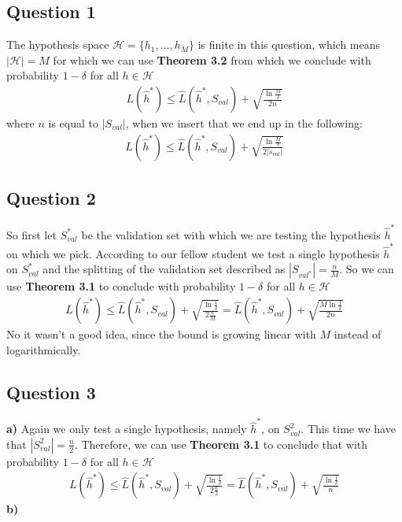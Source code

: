 \subsection{Question 1}
The hypothesis space $\mathcal{H} = \{h_1,...,h_M \}$ is finite in this question, which means $|\mathcal{H}| = M$ for which we can use \textbf{Theorem 3.2} from which we conclude with probability $1 - \delta$ for all $h \in \mathcal{H}$
\begin{align}
L(\hat{h}^*) \leq \hat{L}(\hat{h}^*, S_{val}) + \sqrt{\frac{\ln \frac{M}{\delta}}{2n}}
\end{align}
where $n$ is equal to $|S_{val}|$, when we insert that we end up in the following:
\begin{align}
L(\hat{h}^*) \leq \hat{L}(\hat{h}^*, S_{val}) + \sqrt{\frac{\ln \frac{M}{\delta}}{2|s_{val}|}}
\end{align}

\subsection{Question 2}
So first let $S_{val}^*$ be the validation set with which we are testing the hypothesis $\hat{h}^*$ on which we pick.
According to our fellow student we test a single hypothesis $\hat{h}^*$ on $S_{val}^*$ and the splitting of the validation set described as $|S_{val^*}|=\frac{n}{M}$.
So we can use \textbf{Theorem 3.1} to conclude with probability $1 - \delta$ for all $h \in \mathcal{H}$ 
\begin{align}
L(\hat{h}^*) \leq \hat{L}(\hat{h}^*, S_{val}) + \sqrt{\frac{\ln \frac{1}{\delta}}{2\frac{n}{M}}} = \hat{L}(\hat{h}^*, S_{val}) + \sqrt{\frac{ M \ln \frac{1}{\delta}}{2n}}
\end{align}
No it wasn't a good idea, since the bound is growing linear with $M$ instead of logarithmically.

\subsection{Question 3}


\textbf{a)} Again we only test a single hypothesis, namely $\hat{h}^*$, on $S_{val}^2$. This time we have that $|S_{val}^2|=\frac{n}{2}$. Therefore, we can use \textbf{Theorem 3.1} to conclude that with probability $1 - \delta$ for all $h \in \mathcal{H}$
\begin{align}
L(\hat{h}^*) \leq \hat{L}(\hat{h}^*, S_{val}) + \sqrt{\frac{\ln \frac{1}{\delta}}{2\frac{n}{2}}} = \hat{L}(\hat{h}^*, S_{val}) + \sqrt{\frac{ \ln \frac{1}{\delta}}{n}}
\end{align}
\textbf{b)} 


